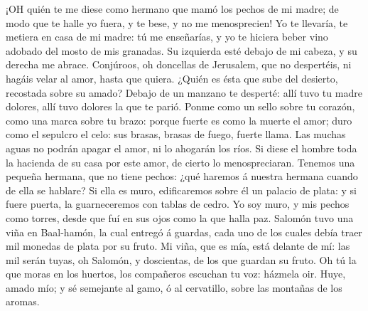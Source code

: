  ¡OH quién te me diese como hermano que mamó los pechos de
mi madre; de modo que te halle yo fuera, y te bese, y no me
menosprecien!  Yo te llevaría, te metiera en casa de mi
madre: tú me enseñarías, y yo te hiciera beber vino adobado del mosto de
mis granadas.  Su izquierda esté debajo de mi cabeza, y su
derecha me abrace.  Conjúroos, oh doncellas de Jerusalem,
que no despertéis, ni hagáis velar al amor, hasta que quiera.
 ¿Quién es ésta que sube del desierto, recostada sobre su
amado? Debajo de un manzano te desperté: allí tuvo tu madre dolores,
allí tuvo dolores la que te parió.  Ponme como un sello
sobre tu corazón, como una marca sobre tu brazo: porque fuerte es como
la muerte el amor; duro como el sepulcro el celo: sus brasas, brasas de
fuego, fuerte llama.  Las muchas aguas no podrán apagar el
amor, ni lo ahogarán los ríos. Si diese el hombre toda la hacienda de su
casa por este amor, de cierto lo menospreciaran.  Tenemos
una pequeña hermana, que no tiene pechos: ¿qué haremos á nuestra hermana
cuando de ella se hablare?  Si ella es muro, edificaremos
sobre él un palacio de plata: y si fuere puerta, la guarneceremos con
tablas de cedro.  Yo soy muro, y mis pechos como torres,
desde que fuí en sus ojos como la que halla paz.  Salomón
tuvo una viña en Baal-hamón, la cual entregó á guardas, cada uno de los
cuales debía traer mil monedas de plata por su fruto.  Mi
viña, que es mía, está delante de mí: las mil serán tuyas, oh Salomón, y
doscientas, de los que guardan su fruto.  Oh tú la que
moras en los huertos, los compañeros escuchan tu voz: házmela oir.
 Huye, amado mío; y sé semejante al gamo, ó al cervatillo,
sobre las montañas de los aromas.
